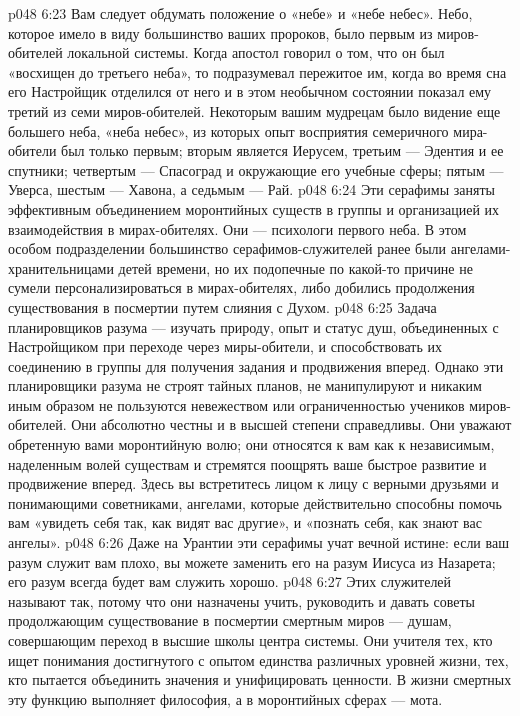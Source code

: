 \vs p048 6:23 \pc Вам следует обдумать положение о «небе» и «небе небес». Небо, которое имело в виду большинство ваших пророков, было первым из миров\hyp{}обителей локальной системы. Когда апостол говорил о том, что он был «восхищен до третьего неба», то подразумевал пережитое им, когда во время сна его Настройщик отделился от него и в этом необычном состоянии показал ему третий из семи миров\hyp{}обителей. Некоторым вашим мудрецам было видение еще большего неба, «неба небес», из которых опыт восприятия семеричного мира\hyp{}обители был только первым; вторым является Иерусем, третьим --- Эдентия и ее спутники; четвертым --- Спасоград и окружающие его учебные сферы; пятым --- Уверса, шестым --- Хавона, а седьмым --- Рай.
\vs p048 6:24 \pc {}\bibnobreakspace {} Эти серафимы заняты эффективным объединением моронтийных существ в группы и организацией их взаимодействия в мирах\hyp{}обителях. Они --- психологи первого неба. В этом особом подразделении большинство серафимов\hyp{}служителей ранее были ангелами\hyp{}хранительницами детей времени, но их подопечные по какой\hyp{}то причине не сумели персонализироваться в мирах\hyp{}обителях, либо добились продолжения существования в посмертии путем слияния с Духом.
\vs p048 6:25 Задача планировщиков разума --- изучать природу, опыт и статус душ, объединенных с Настройщиком при переходе через миры\hyp{}обители, и способствовать их соединению в группы для получения задания и продвижения вперед. Однако эти планировщики разума не строят тайных планов, не манипулируют и никаким иным образом не пользуются невежеством или ограниченностью учеников миров\hyp{}обителей. Они абсолютно честны и в высшей степени справедливы. Они уважают обретенную вами моронтийную волю; они относятся к вам как к независимым, наделенным волей существам и стремятся поощрять ваше быстрое развитие и продвижение вперед. Здесь вы встретитесь лицом к лицу с верными друзьями и понимающими советниками, ангелами, которые действительно способны помочь вам «увидеть себя так, как видят вас другие», и «познать себя, как знают вас ангелы».
\vs p048 6:26 Даже на Урантии эти серафимы учат вечной истине: если ваш разум служит вам плохо, вы можете заменить его на разум Иисуса из Назарета; его разум всегда будет вам служить хорошо.
\vs p048 6:27 \pc {}\bibnobreakspace {} Этих служителей называют так, потому что они назначены учить, руководить и давать советы продолжающим существование в посмертии смертным миров --- душам, совершающим переход в высшие школы центра системы. Они учителя тех, кто ищет понимания достигнутого с опытом единства различных уровней жизни, тех, кто пытается объединить значения и унифицировать ценности. В жизни смертных эту функцию выполняет философия, а в моронтийных сферах --- мота.
